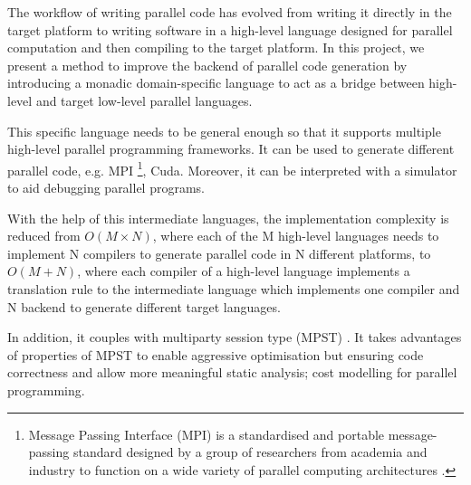 The workflow of writing parallel code has evolved from writing it directly in the target platform to writing software in a high-level language designed for parallel computation and then compiling to the target platform. In this project, we present a method to improve the backend of parallel code generation by introducing a monadic domain-specific language to act as a bridge between high-level and target low-level parallel languages.

This specific language needs to be general enough so that it supports multiple high-level parallel programming frameworks. It can be used to generate different parallel code, e.g. MPI \footnote{Message Passing Interface (MPI) is a standardised and portable message-passing standard designed by a group of researchers from academia and industry to function on a wide variety of parallel computing architectures \cite{MessagePassingInterface2018}.}, Cuda. Moreover, it can be interpreted with a simulator to aid debugging parallel programs.

With the help of this intermediate languages, the implementation complexity is reduced from $O(M \times N)$, where each of the M high-level languages needs to implement N compilers to generate parallel code in N different platforms, to $O(M + N)$, where each compiler of a high-level language implements a translation rule to the intermediate language which implements one compiler and N backend to generate different target languages.

In addition, it couples with multiparty session type (MPST) \cite{coppoGentleIntroductionMultiparty2015}. It takes advantages of properties of MPST to enable aggressive optimisation but ensuring code correctness and allow more meaningful static analysis; \eg cost modelling for parallel programming. %


